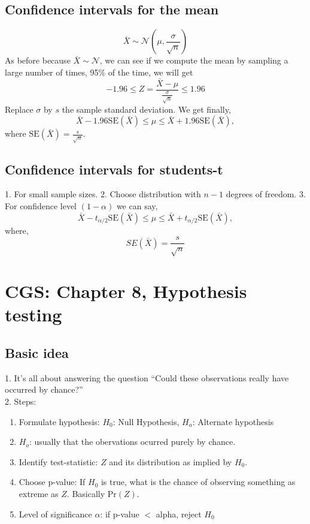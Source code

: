 \documentclass{article}
\newcommand{\beq}{\begin{equation}}
\newcommand{\eeq}{\end{equation}}
\begin{document}
\subsection{Confidence intervals for the mean}
\beq
\bar{X} \sim \mathcal{N}(\mu,\frac{\sigma}{\sqrt{n}})
\eeq
As before because $\bar{X}\sim\mathcal{N}$, we can see if we compute the mean by sampling a large number of times, 95\% of the time, we will get
\beq
-1.96 \le Z=\frac{\bar{X}-\mu}{\frac{\sigma}{\sqrt{n}}} \le 1.96
\eeq
Replace $\sigma$ by $s$ the sample standard deviation. We get finally,
\beq
\bar{X} - 1.96\text{SE}(\bar{X}) \le \mu \le \bar{X} + 1.96\text{SE}(\bar{X}),
\eeq
where $\text{SE}(\bar{X})=\frac{s}{\sqrt{n}}$.
\subsection{Confidence intervals for students-t}
1. For small sample sizes.
2. Choose distribution with $n-1$ degrees of freedom.
3. For confidence level $(1-\alpha)$ we can say,
\beq
\bar{X} - t_{\alpha/2}\text{SE}(\bar{X}) \le \mu \le \bar{X} + t_{\alpha/2}\text{SE}(\bar{X}),
\eeq
where,
\beq
SE(\bar{X}) = \frac{s}{\sqrt{n}}
\eeq
\section{CGS: Chapter 8, Hypothesis testing}
\subsection{Basic idea}
1. It's all about answering the question ``Could these observations really have occurred by chance?'' \\
2. Steps:
\begin{enumerate}
\item{Formulate hypothesis: $H_0$: Null Hypothesis, $H_a$: Alternate hypothesis}
\item{$H_o$: usually that the obervations ocurred purely by chance.}
\item{Identify test-statistic: $Z$ and its distribution as implied by $H_0$.}
\item{Choose p-value: If $H_0$ is true, what is the chance of observing something as extreme as $Z$. Basically Pr$(Z)$.}
\item{Level of significance $\alpha$: if p-value $<$ alpha, reject $H_0$}  
\end{enumerate}
\end{document}
